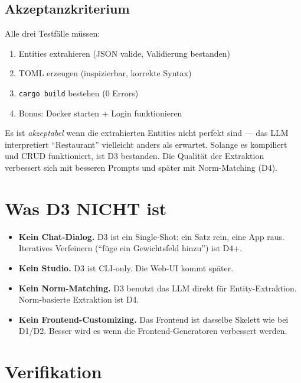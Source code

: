 \documentclass[11pt,a4paper]{article}
\begin{document}
\subsection{Akzeptanzkriterium}

Alle drei Testf\"alle m\"ussen:
\begin{enumerate}[nosep]
\item Entities extrahieren (JSON valide, Validierung bestanden)
\item TOML erzeugen (inspizierbar, korrekte Syntax)
\item \texttt{cargo build} bestehen (0 Errors)
\item Bonus: Docker starten + Login funktionieren
\end{enumerate}

Es ist \emph{akzeptabel} wenn die extrahierten Entities nicht perfekt
sind --- das LLM interpretiert ``Restaurant'' vielleicht anders als
erwartet. Solange es kompiliert und CRUD funktioniert, ist D3 bestanden.
Die Qualit\"at der Extraktion verbessert sich mit besseren Prompts
und sp\"ater mit Norm-Matching (D4).

\section{Was D3 NICHT ist}

\begin{itemize}[nosep]
\item \textbf{Kein Chat-Dialog.} D3 ist ein Single-Shot: ein Satz rein,
      eine App raus. Iteratives Verfeinern (``f\"uge ein Gewichtsfeld
      hinzu'') ist D4+.
\item \textbf{Kein Studio.} D3 ist CLI-only. Die Web-UI kommt sp\"ater.
\item \textbf{Kein Norm-Matching.} D3 benutzt das LLM direkt f\"ur
      Entity-Extraktion. Norm-basierte Extraktion ist D4.
\item \textbf{Kein Frontend-Customizing.} Das Frontend ist dasselbe
      Skelett wie bei D1/D2. Besser wird es wenn die Frontend-Generatoren
      verbessert werden.
\end{itemize}

\section{Verifikation}
\end{document}
